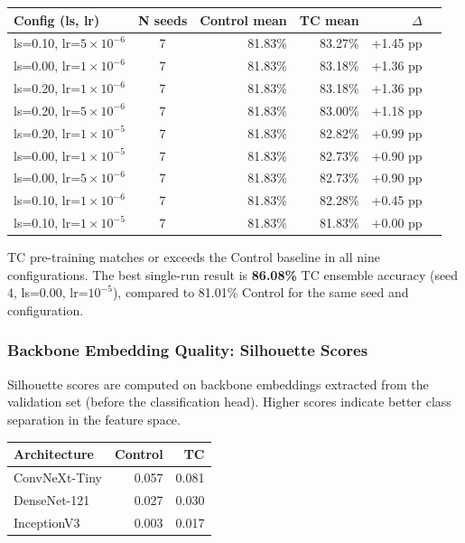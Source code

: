 \documentclass[12pt,a4paper]{article}
\begin{document}
\begin{center}
\begin{tabular}{lcrrrr}
\toprule
\textbf{Config (ls, lr)} & \textbf{N seeds} &
\textbf{Control mean} & \textbf{TC mean} & \textbf{$\Delta$} \\
\midrule
ls=0.10, lr=$5\times10^{-6}$ & 7 & 81.83\% & 83.27\% & +1.45 pp \\
ls=0.00, lr=$1\times10^{-6}$ & 7 & 81.83\% & 83.18\% & +1.36 pp \\
ls=0.20, lr=$1\times10^{-6}$ & 7 & 81.83\% & 83.18\% & +1.36 pp \\
ls=0.20, lr=$5\times10^{-6}$ & 7 & 81.83\% & 83.00\% & +1.18 pp \\
ls=0.20, lr=$1\times10^{-5}$ & 7 & 81.83\% & 82.82\% & +0.99 pp \\
ls=0.00, lr=$1\times10^{-5}$ & 7 & 81.83\% & 82.73\% & +0.90 pp \\
ls=0.00, lr=$5\times10^{-6}$ & 7 & 81.83\% & 82.73\% & +0.90 pp \\
ls=0.10, lr=$1\times10^{-6}$ & 7 & 81.83\% & 82.28\% & +0.45 pp \\
ls=0.10, lr=$1\times10^{-5}$ & 7 & 81.83\% & 81.83\% & +0.00 pp \\
\bottomrule
\end{tabular}
\end{center}

TC pre-training matches or exceeds the Control baseline in all nine
configurations. The best single-run result is \textbf{86.08\%} TC ensemble
accuracy (seed 4, ls=0.00, lr=$10^{-5}$), compared to 81.01\% Control for
the same seed and configuration.

\subsubsection{Backbone Embedding Quality: Silhouette Scores}

Silhouette scores are computed on backbone embeddings extracted from the
validation set (before the classification head). Higher scores indicate
better class separation in the feature space.

\begin{center}
\begin{tabular}{lrr}
\toprule
\textbf{Architecture} & \textbf{Control} & \textbf{TC} \\
\midrule
ConvNeXt-Tiny & 0.057 & 0.081 \\
DenseNet-121  & 0.027 & 0.030 \\
InceptionV3   & \text{-}0.003 & \text{-}0.017 \\
\bottomrule
\end{tabular}
\end{center}
\end{document}
